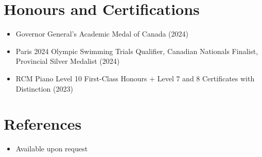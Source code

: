\documentclass[letterpaper,11pt]{article}
\newcommand{\resumeItem}[1]{
  \item\small{
    {#1 \vspace{-2pt}}
  }
}
\newcommand{\resumeItemListStart}{\begin{itemize}}
\newcommand{\resumeItemListEnd}{\end{itemize}\vspace{-8pt}}
\begin{document}
\section{Honours and Certifications}
  \resumeItemListStart
    \vspace{-2pt}\resumeItem{Governor General's Academic Medal of Canada (2024)}
    \vspace{-2pt}\resumeItem{Paris 2024 Olympic Swimming Trials Qualifier, Canadian Nationals Finalist, Provincial Silver Medalist (2024)}
    \vspace{-2pt}\resumeItem{RCM Piano Level 10 First-Class Honours + Level 7 and 8 Certificates with Distinction (2023)}
  \resumeItemListEnd
\vspace{-2pt}

\section{References}
  \resumeItemListStart
    \resumeItem{Available upon request}
  \resumeItemListEnd

\end{document}
